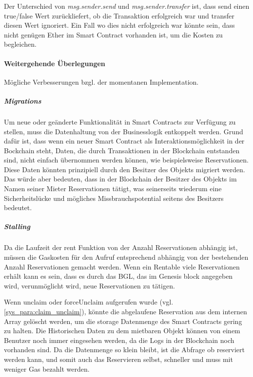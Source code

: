 Der Unterschied von \emph{msg.sender.send} und \emph{msg.sender.transfer} ist, dass send einen true/false Wert zurückliefert, ob die Transaktion erfolgreich war und transfer diesen Wert ignoriert. Ein Fall wo dies nicht erfolgreich war könnte sein, dass nicht genügen Ether im Smart Contract vorhanden ist, um die Kosten zu begleichen.
\paragraph{Weitergehende Überlegungen}
\label{para:Rentable_weitergehend}
Mögliche Verbesserungen bzgl. der momentanen Implementation.

\subparagraph{Migrations}
Um neue oder geänderte Funktionalität in Smart Contracts zur Verfügung zu stellen, muss die Datenhaltung von der Businesslogik entkoppelt werden. Grund dafür ist, dass wenn ein neuer Smart Contract als Interaktionsmöglichkeit in der Bockchain steht, Daten, die durch Transaktionen in der Blockchain entstanden sind, nicht einfach übernommen werden können, wie beispielsweise Reservationen. Diese Daten könnten prinzipiell durch den Besitzer des Objekts migriert werden. Das würde aber bedeuten, dass in der Blockchain der Besitzer des Objekts im Namen seiner Mieter Reservationen tätigt, was seinerseits wiederum eine Sicherheitslücke und mögliches Missbrauchspotential seitens des Besitzers bedeutet.

\subparagraph{Stalling}
\label{subpara:Stalling}
Da die Laufzeit der rent Funktion von der Anzahl Reservationen abhängig ist, müssen die Gaskosten für den Aufruf entsprechend abhängig von der bestehenden Anzahl Reservationen gemacht werden. Wenn ein Rentable viele Reservationen erhält kann es sein, dass es durch das \acrfull{BGL}, das im Genesis block angegeben wird, verunmöglicht wird, neue Reservationen zu tätigen.\cite[Security Considerations/Gas Limit and Loops]{solidity.readthedocs.io}\cite{media.consensys.net/gas-and-fuel}

Wenn unclaim oder forceUnclaim aufgerufen wurde (vgl. \ref{sys_para:claim_unclaim}), könnte die abgelaufene Reservation aus dem internen Array gelöscht werden, um die storage Datenmenge des Smart Contracts gering zu halten. Die Historischen Daten zu dem mietbaren Objekt können von einem Benutzer noch immer eingesehen werden, da die Logs in der Blockchain noch vorhanden sind. Da die Datenmenge so klein bleibt, ist die Abfrage ob reserviert werden kann, und somit auch das Reservieren selbst, schneller und muss mit weniger Gas bezahlt werden.\cite{media.consensys.net/gas-and-fuel}

